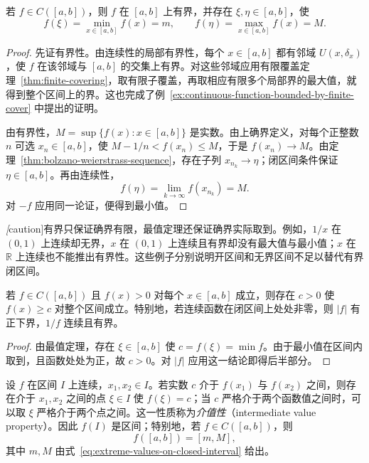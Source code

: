 \begin{theorem}[有界性与最值定理]
\label{thm:boundedness-and-extreme-values}
若 $f\in C([a,b])$，则 $f$ 在 $[a,b]$ 上有界，并存在 $\xi,\eta\in[a,b]$，使
\begin{equation}
    f(\xi)=\min_{x\in[a,b]}f(x)=m,
    \qquad f(\eta)=\max_{x\in[a,b]}f(x)=M.
    \label{eq:extreme-values-on-closed-interval}
\end{equation}
\end{theorem}

\begin{proof}
先证有界性。由连续性的局部有界性，每个 $x\in[a,b]$ 都有邻域 $U(x,\delta_x)$，使 $f$ 在该邻域与 $[a,b]$ 的交集上有界。对这些邻域应用有限覆盖定理~\ref{thm:finite-covering}，取有限子覆盖，再取相应有限多个局部界的最大值，就得到整个区间上的界。这也完成了例~\ref{ex:continuous-function-bounded-by-finite-cover} 中提出的证明。

由有界性，$M=\sup\{f(x):x\in[a,b]\}$ 是实数。由上确界定义，对每个正整数 $n$ 可选 $x_n\in[a,b]$，使 $M-1/n<f(x_n)\leq M$，于是 $f(x_n)\to M$。由定理~\ref{thm:bolzano-weierstrass-sequence}，存在子列 $x_{n_k}\to\eta$；闭区间条件保证 $\eta\in[a,b]$。再由连续性，
\[
    f(\eta)=\lim_{k\to\infty}f(x_{n_k})=M.
\]
对 $-f$ 应用同一论证，便得到最小值。
\end{proof}

\emph[caution]{有界只保证确界有限，最值定理还保证确界实际取到。}例如，$1/x$ 在 $(0,1)$ 上连续却无界，$x$ 在 $(0,1)$ 上连续且有界却没有最大值与最小值；$x$ 在 $\mathbb{R}$ 上连续也不能推出有界性。这些例子分别说明开区间和无界区间不足以替代有界闭区间。

\begin{corollary}[严格正的连续函数有统一正下界]
\label{cor:positive-continuous-function-lower-bound}
若 $f\in C([a,b])$ 且 $f(x)>0$ 对每个 $x\in[a,b]$ 成立，则存在 $c>0$ 使 $f(x)\geq c$ 对整个区间成立。特别地，若连续函数在闭区间上处处非零，则 $|f|$ 有正下界，$1/f$ 连续且有界。
\end{corollary}

\begin{proof}
由最值定理，存在 $\xi\in[a,b]$ 使 $c=f(\xi)=\min f$。由于最小值在区间内取到，且函数处处为正，故 $c>0$。对 $|f|$ 应用这一结论即得后半部分。
\end{proof}

\begin{theorem}[介值定理]
\label{thm:intermediate-value-property}
设 $f$ 在区间 $I$ 上连续，$x_1,x_2\in I$。若实数 $c$ 介于 $f(x_1)$ 与 $f(x_2)$ 之间，则存在介于 $x_1,x_2$ 之间的点 $\xi\in I$ 使 $f(\xi)=c$；当 $c$ 严格介于两个函数值之间时，可以取 $\xi$ 严格介于两个点之间。这一性质称为\emph{介值性}（intermediate value property）。因此 $f(I)$ 是区间；特别地，若 $f\in C([a,b])$，则
\begin{equation}
    f([a,b])=[m,M],
    \label{eq:continuous-image-of-closed-interval}
\end{equation}
其中 $m,M$ 由式~\eqref{eq:extreme-values-on-closed-interval} 给出。
\end{theorem}


